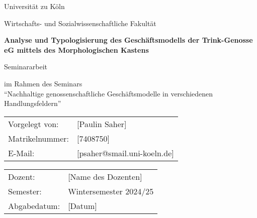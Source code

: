 \begin{titlepage}
\centering

\vspace*{2cm}

{\Large Universität zu Köln}

\vspace{1cm}

{\large Wirtschafts- und Sozialwissenschaftliche Fakultät}

\vspace{2cm}

{\huge\bfseries Analyse und Typologisierung des Geschäftsmodells der Trink-Genosse eG mittels des Morphologischen Kastens}

\vspace{2cm}

{\Large Seminararbeit}

\vspace{1cm}

{\large im Rahmen des Seminars\\
\enquote{Nachhaltige genossenschaftliche Geschäftsmodelle in verschiedenen Handlungsfeldern}}

\vspace{3cm}

\begin{tabular}{ll}
Vorgelegt von: & [Paulin Saher] \\
Matrikelnummer: & [7408750] \\
E-Mail: & [psaher@smail.uni-koeln.de] \\
\end{tabular}

\vspace{2cm}

\begin{tabular}{ll}
Dozent: & [Name des Dozenten] \\
Semester: & Wintersemester 2024/25 \\
Abgabedatum: & [Datum] \\
\end{tabular}

\end{titlepage}
\newpage
